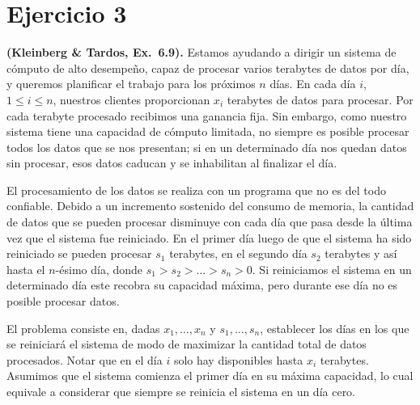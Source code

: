 \section{Ejercicio 3}

\begin{enunciado}
\textbf{(Kleinberg \& Tardos, Ex.~6.9).} Estamos ayudando a dirigir un sistema de cómputo de alto desempeño, capaz de procesar varios terabytes de datos por día, y queremos planificar el trabajo para los próximos $n$ días. En cada día $i$, $1\le i\le n$, nuestros clientes proporcionan $x_i$ terabytes de datos para procesar. Por cada terabyte procesado recibimos una ganancia fija. Sin embargo, como nuestro sistema tiene una capacidad de cómputo limitada, no siempre es posible procesar todos los datos que se nos presentan; si en un determinado día nos quedan datos sin procesar, esos datos caducan y se inhabilitan al finalizar el día.

El procesamiento de los datos se realiza con un programa que no es del todo confiable. Debido a un incremento sostenido del consumo de memoria, la cantidad de datos que se pueden procesar disminuye con cada día que pasa desde la última vez que el sistema fue reiniciado. En el primer día luego de que el sistema ha sido reiniciado se pueden procesar $s_1$ terabytes, en el segundo día $s_2$ terabytes y así hasta el $n$-ésimo día, donde $s_1>s_2>\dots>s_n>0$. Si reiniciamos el sistema en un determinado día este recobra su capacidad máxima, pero durante ese día no es posible procesar datos.

El problema consiste en, dadas $x_1,\dots,x_n$ y $s_1,\dots,s_n$, establecer los días en los que se reiniciará el sistema de modo de maximizar la cantidad total de datos procesados. Notar que en el día $i$ solo hay disponibles hasta $x_i$ terabytes. Asumimos que el sistema comienza el primer día en su máxima capacidad, lo cual equivale a considerar que siempre se reinicia el sistema en un día cero.


\end{enunciado}
